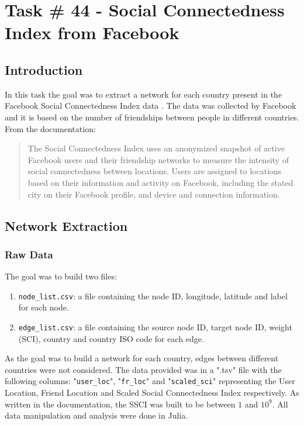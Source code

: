 \chapter{Task \# 44 - Social Connectedness Index  from Facebook}

\section{Introduction}
In this task the goal was to extract a network for each country present in the Facebook Social Connectedness Index data \cite{FacebookSocialConnectednessIndexData}.
The data was collected by Facebook and it is based on the number of friendships between people in different countries.
From the documentation:
\begin{quote}
The Social Connectedness Index uses an anonymized snapshot of active Facebook users and their friendship networks to measure the intensity of social connectedness between locations. Users are assigned to locations based on their information and activity on Facebook, including the stated city on their Facebook profile, and device and connection information.
\end{quote}

\section{Network Extraction}
\subsection{Raw Data}
The goal was to build two files:
\begin{enumerate}
    \item \texttt{node\_list.csv}: a file containing the node ID, longitude, latitude and label for each node.
    \item \texttt{edge\_list.csv}: a file containing the source node ID, target node ID, weight (SCI), country and country ISO code for each edge.
\end{enumerate}
As the goal was to build a network for each country, edges between different countries were not considered.
The data provided was in a ".tsv" file with the following columns: "\texttt{user\_loc}", "\texttt{fr\_loc}" and "\texttt{scaled\_sci}" representing the User Location, Friend Location and Scaled Social Connectedness Index respectively.
As written in the documentation, the SSCI was built to be between $1$ and $10^9$.
All data manipulation and analysis were done in Julia\cite{julia}.


